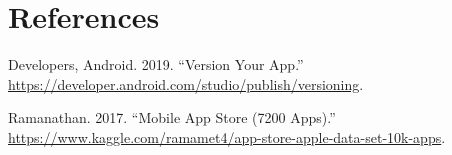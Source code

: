 \documentclass[
]{article}
\begin{document}
\hypertarget{references}{%
\section*{References}\label{references}}

\hypertarget{refs}{}
\leavevmode\hypertarget{ref-version_code}{}%
Developers, Android. 2019. ``Version Your App.'' \url{https://developer.android.com/studio/publish/versioning}.

\leavevmode\hypertarget{ref-dataset}{}%
Ramanathan. 2017. ``Mobile App Store (7200 Apps).'' \url{https://www.kaggle.com/ramamet4/app-store-apple-data-set-10k-apps}.
\end{document}
